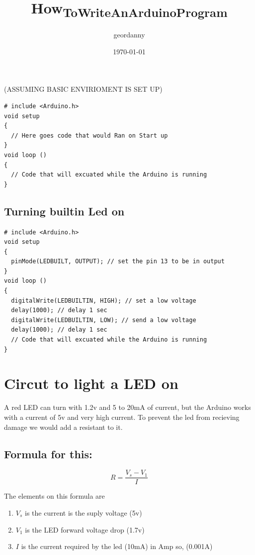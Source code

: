 \documentclass[11pt]{article}
\author{geordanny}
\date{\today}
\title{How\textsubscript{To}\textsubscript{Write}\textsubscript{An}\textsubscript{Arduino}\textsubscript{Program}}
\begin{document}
\maketitle
\tableofcontents

(ASSUMING BASIC ENVIRIOMENT IS SET UP)

\begin{verbatim}
# include <Arduino.h>
void setup
{
  // Here goes code that would Ran on Start up
}
void loop ()
{
  // Code that will excuated while the Arduino is running
}
\end{verbatim}

\subsection{Turning builtin Led on}
\label{sec:org79e5f3d}

\begin{verbatim}
# include <Arduino.h>
void setup
{
  pinMode(LEDBUILT, OUTPUT); // set the pin 13 to be in output
}
void loop ()
{
  digitalWrite(LEDBUILTIN, HIGH); // set a low voltage
  delay(1000); // delay 1 sec
  digitalWrite(LEDBUILTIN, LOW); // send a low voltage
  delay(1000); // delay 1 sec
  // Code that will excuated while the Arduino is running
}
\end{verbatim}

\section{Circut to light a LED on}
\label{sec:org71e55b1}

A red LED can turn with 1.2v and 5 to 20mA of current, but the Arduino
works with a current of 5v and very high current. To prevent the
led from recieving damage we would add a resistant to it.

\subsection{Formula for this:}
\label{sec:orgb68cbfb}

\[
R = \frac{V_s - V_1}{I}
\]

The elements on this formula are
\begin{enumerate}
\item \(V_s\) is the current is the suply voltage (5v)
\item \(V_1\) is the LED forward voltage drop (1.7v)
\item \(I\)   is the current required by the led (10mA) in Amp so, (0.001A)
\end{enumerate}
\end{document}
